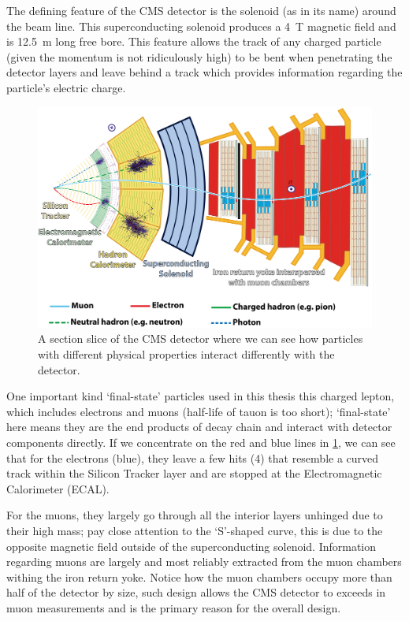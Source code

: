 The defining feature of the CMS detector is the solenoid (as in its name) around the beam line.
This superconducting solenoid produces a \SI{4}{\tesla} magnetic field and is 
\SI{12.5}{\meter} long free bore.\cite{validation_cms} This feature allows the track of
any charged particle (given the momentum is not ridiculously high) to be bent when penetrating
the detector layers and leave behind a track which provides information regarding the particle's 
electric charge.


\begin{figure}[htb]
\begin{center}
\includegraphics[width=.75\linewidth]{fig/CMS_Slice.png}
\end{center}
\caption{A section slice of the CMS detector where we can see how 
particles with different physical properties interact differently with the detector.}
\label{fig:CMS_Slice}
\end{figure}

One important kind `final-state' particles used in this thesis this charged lepton, 
which includes electrons and muons (half-life of tauon is too short);
`final-state' here means they are the end products of decay chain and interact with detector
components directly. If we concentrate on the red and blue lines in \ref{fig:CMS_Slice}, we
can see that for the electrons (blue), they leave a few hits (4) that resemble a curved
track within the Silicon Tracker layer and are stopped at the Electromagnetic Calorimeter
(ECAL). 

For the muons, they largely go through all the interior layers unhinged due to their
high mass; pay close attention to the `S'-shaped curve, this is due to the opposite magnetic
field outside of the superconducting solenoid. Information regarding muons are largely and 
most reliably extracted from the muon chambers withing the iron return yoke. Notice how the
muon chambers occupy more than half of the detector by size, such design allows the CMS 
detector to exceeds in muon measurements and is the primary reason for the overall design.

